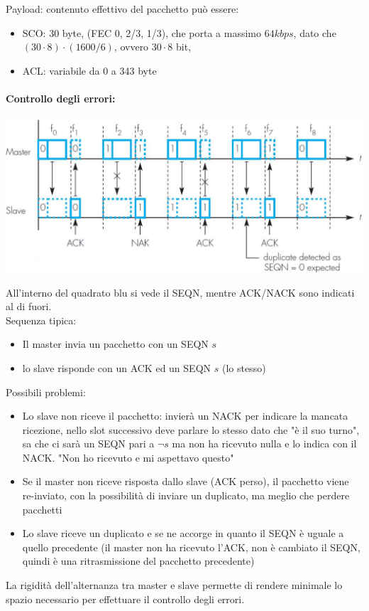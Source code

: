 Payload: contenuto effettivo del pacchetto può essere: 
\begin{itemize}
	\item SCO: 30 byte,  (FEC 0, 2/3, 1/3), che porta a massimo $64kbps$, dato che $(30 \cdot 8) \cdot (1600/6)$, ovvero $30 \cdot 8$ bit, 
	\item ACL: variabile da 0 a 343 byte
\end{itemize}

\paragraph{Controllo degli errori: }
\begin{center}
	\includegraphics[width=0.9\linewidth]{img/wpan/errorcorr1}
\end{center}

All'interno del quadrato blu si vede il SEQN, mentre ACK/NACK sono indicati al di fuori.\\

Sequenza tipica:
\begin{itemize}
	\item Il master invia un pacchetto con un SEQN $s$
	\item lo slave risponde con un ACK ed un SEQN $s$ (lo stesso)
\end{itemize}

Possibili problemi: 
\begin{itemize}
	\item Lo slave non riceve il pacchetto: invierà un NACK per indicare la mancata ricezione, nello slot successivo deve parlare lo stesso dato che "è il suo turno", sa che ci sarà un SEQN pari a $\neg s$ ma non ha ricevuto nulla e lo indica con il NACK. "Non ho ricevuto e mi aspettavo questo"
	\item Se il master non riceve risposta dallo slave (ACK perso), il pacchetto viene re-inviato, con la possibilità di inviare un duplicato, ma meglio che perdere pacchetti
	\item Lo slave riceve un duplicato e se ne accorge in quanto il SEQN è uguale a quello precedente (il master non ha ricevuto l'ACK, non è cambiato il SEQN, quindi è una ritrasmissione del pacchetto precedente)
\end{itemize}
La rigidità dell'alternanza tra master e slave permette di rendere minimale lo spazio necessario per effettuare il controllo degli errori.\\

